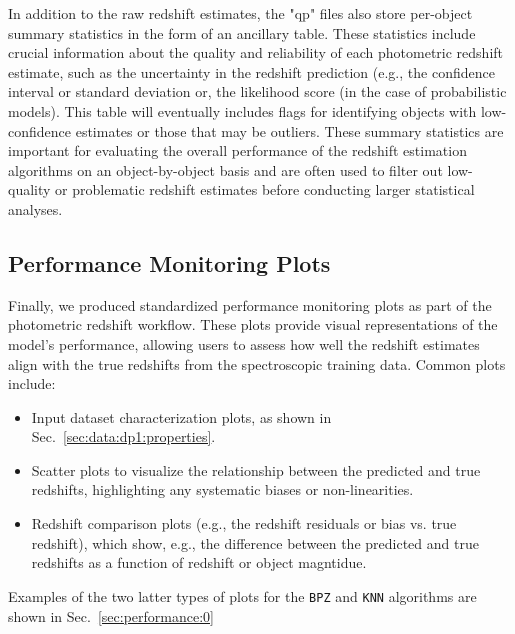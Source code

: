 In addition to the raw redshift estimates, the "qp" files also store per-object summary statistics in the form of an ancillary table.  These statistics include crucial information about the quality and reliability of each photometric redshift estimate, such as the uncertainty in the redshift prediction (e.g., the confidence interval or standard deviation or, the likelihood score (in the case of probabilistic models).   This table will eventually includes flags for identifying objects with low-confidence estimates or those that may be outliers.  These summary statistics are important for evaluating the overall performance of the redshift estimation algorithms on an object-by-object basis and are often used to filter out low-quality or problematic redshift estimates before conducting larger statistical analyses.




\subsection{Performance Monitoring Plots}
\label{sec:products:peformance_plots}

Finally, we produced standardized performance monitoring plots as part of the photometric redshift workflow.  These plots provide visual representations of the model's performance, allowing users to assess how well the redshift estimates align with the true redshifts from the spectroscopic training data.  Common plots include:

\begin{itemize}
\item{Input dataset characterization plots, as shown in Sec.~\ref{sec:data:dp1:properties}.}
\item{Scatter plots to visualize the relationship between the predicted and true redshifts, highlighting any systematic biases or non-linearities.}
\item{Redshift comparison plots (e.g., the redshift residuals or bias vs.  true redshift), which show, e.g., the difference between the predicted and true redshifts as a function of redshift or object magntidue.}
\end{itemize}

Examples of the two latter types of plots for the \texttt{BPZ} and \texttt{KNN} algorithms are shown in Sec.~\ref{sec:performance:0}



